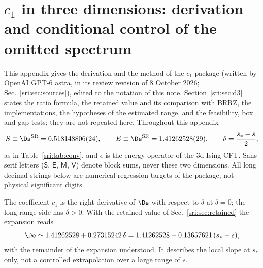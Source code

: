 \section{\texorpdfstring{$c_1$}{c1} in three dimensions: derivation and conditional control of the omitted spectrum}\label{sri:app:cone}
This appendix gives the derivation and the method of the $c_1$ package (written by OpenAI GPT-6 astra, in its review
revision of 8 October 2026; Sec.~\ref{sri:sec:sources}), edited to the notation of this note. Section~\ref{sri:sec:d3} states
the ratio formula, the retained value and its comparison with BRRZ, the implementations, the hypotheses of the
estimated range, and the feasibility, box and gap tests; they are not repeated here. Throughout this appendix
\begin{equation}
 S\equiv\Ds^{\rm SR}=0.518148806(24),\qquad E\equiv\De^{\rm SR}=1.41262528(29),\qquad
 \delta=\frac{s_*-s}{2},
\end{equation}
as in Table~\ref{sri:tab:conv}, and $\epsilon$ is the energy operator of the 3d Ising CFT. Sans-serif letters
($\mathsf S$, $\mathsf E$, $\mathsf M$, $\mathsf V$) denote block sums, never these two dimensions. All long decimal
strings below are numerical regression targets of the package, not physical significant digits.

The coefficient $c_1$ is the right derivative of $\De$ with respect to $\delta$ at $\delta=0$; the long-range side has $\delta>0$. With the retained value
of Sec.~\ref{sri:sec:retained} the expansion reads
\begin{equation}
 \De\simeq1.41262528+0.27315242\,\delta=1.41262528+0.13657621\,(s_*-s),
\end{equation}
with the remainder of the expansion understood. It describes the local slope at $s_*$ only, not a controlled
extrapolation over a large range of $s$.

